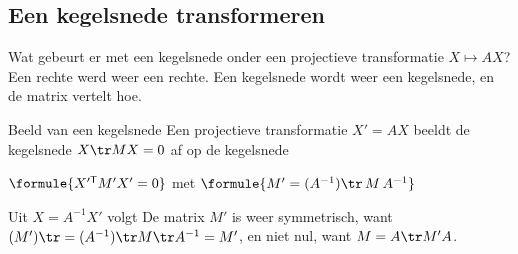 
\begin{oefeningen}
\end{oefeningen}

\subsection{Een kegelsnede transformeren}

Wat gebeurt er met een kegelsnede onder een projectieve transformatie $X \mapsto AX$? Een rechte werd weer een rechte. Een kegelsnede wordt weer een kegelsnede, en de matrix vertelt hoe.

\begin{theorie}
\begin{stelling}{Beeld van een kegelsnede}
Een projectieve transformatie $X' = AX$ beeldt de kegelsnede $X\tr MX = 0$ af op de kegelsnede

\vspace{1mm}
\qquad $\formule{X'^{\mathsf T}M'X' = 0}$ \qquad met \qquad $\formule{M' = (A^{-1})\tr\,M\,A^{-1}}$
\end{stelling}

\begin{bewijs}
Uit $X = A^{-1}X'$ volgt
De matrix $M'$ is weer symmetrisch, want $(M')\tr = (A^{-1})\tr M\tr A^{-1} = M'$, en niet nul, want $M = A\tr M'A$.
\end{bewijs}
\end{theorie}

